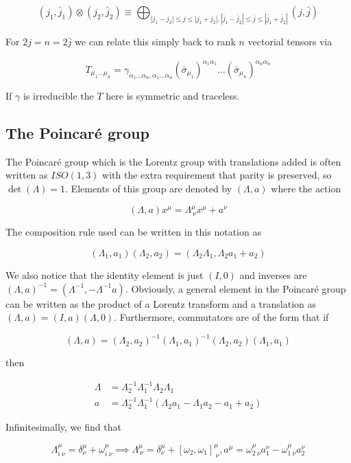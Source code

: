\documentclass{article}
\theoremstyle{definition}
\begin{document}
$$ (j_1, \bar{j}_1) \otimes (j_2, \bar{j}_2) \equiv \bigoplus_{|j_1 - j_2| \leq
  j \leq |j_1 + j_2|, |\bar{j}_1 - \bar{j}_2| \leq \bar{j} \leq |\bar{j}_1 +
  \bar{j}_2 |} (j, \bar{j}) $$

For $2j = n = 2\bar{j}$ we can relate this simply back to rank $n$ vectorial
tensors via

$$ T_{\mu_1 \dots \mu_n} = \gamma_{\alpha_1 \dots \alpha_n, \dot{\alpha}_1 \dots
\dot{\alpha}_n} (\bar{\sigma}_{\mu_1})^{\dot{\alpha}_1 \alpha_1} \dots
(\bar{\sigma}_{\mu_n})^{\dot{\alpha}_n \alpha_n} $$

If $\gamma$ is irreducible the $T$ here is symmetric and traceless.

\subsection{The Poincar\'{e} group}

The Poincar\'{e} group which is the Lorentz group with translations added is
often written as $ISO(1, 3)$ with the extra requirement that parity is
preserved, so $\det(\Lambda) = 1$. Elements of this group are denoted by
$(\Lambda, a)$ where the action

$$ (\Lambda, a) x^\mu = \Lambda^\mu_{\ \nu} x^\mu + a^\nu $$

The composition rule used can be written in this notation as

$$ (\Lambda_1, a_1) (\Lambda_2, a_2) = (\Lambda_2 \Lambda_1, \Lambda_2 a_1 +
a_2) $$

We also notice that the identity element is just $(I, 0)$ and inverses are
$(\Lambda, a)^{-1} = (\Lambda^{-1}, -\Lambda^{-1} a)$. Obviously, a general
element in the Poincar\'{e} group can be written as the product of a Lorentz
transform and a translation as $(\Lambda, a) = (I, a) (\Lambda, 0)$.
Furthermore, commutators are of the form that if 

$$ (\Lambda, a) = (\Lambda_2, a_2)^{-1} (\Lambda_1, a_1)^{-1} (\Lambda_2, a_2)
(\Lambda_1, a_1) $$

then

\begin{align*}
\Lambda &= \Lambda_2^{-1} \Lambda_1^{-1} \Lambda_2 \Lambda_1 \\
a &= \Lambda_2^{-1} \Lambda_1^{-1} (\Lambda_2 a_1 - \Lambda_1 a_2 - a_1 + a_2) 
\end{align*}

Infinitesimally, we find that

$$ \Lambda^\mu_{i\ \nu} = \delta^\mu_\nu + \omega^\mu_{i\ \nu} \implies
\Lambda^\mu_{\ \nu} = \delta^\mu_\nu + [\omega_2, \omega_1]^\mu_{\ \nu}, a^\mu
= \omega^\mu_{2\ \nu} a^\nu_1 - \omega^\mu_{1\ \nu} a^\nu_2 $$
\end{document}
